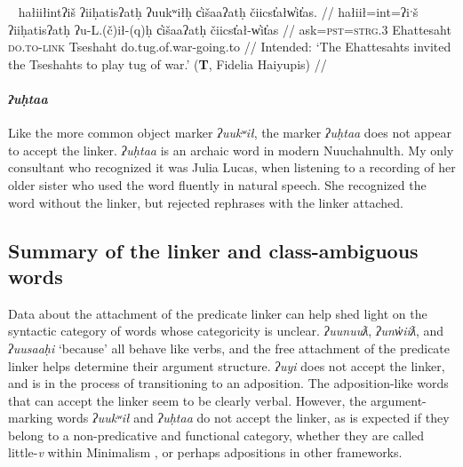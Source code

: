 \ex~ \label{ex:tugofwar2}
\begingl
\glpreamble *hałiiłintʔiš ʔiiḥatisʔatḥ ʔuukʷiłḥ c̓išaaʔatḥ čiicst̓ałw̓it̓as. //
\gla hałiił=int=ʔiˑš ʔiiḥatisʔatḥ ʔu-L.(č)ił-(q)ḥ c̓išaaʔatḥ čiicst̓ał-w̓it̓as //
\glb ask=\textsc{pst}=\textsc{strg.3} Ehattesaht \textsc{do.to}-\textsc{link} Tseshaht do.tug.of.war-going.to //
\glft Intended: `The Ehattesahts invited the Tseshahts to play tug of war.' (\textbf{T}, Fidelia Haiyupis) //
\endgl
\xe

\paragraph{\textit{ʔuḥtaa}} \label{ch:link:uhta} Like the more common object marker \textit{ʔuukʷił}, the marker \textit{ʔuḥtaa} does not appear to accept the linker. \textit{ʔuḥtaa} is an archaic word in modern Nuuchahnulth. My only consultant who recognized it was Julia Lucas, when listening to a recording of her older sister who used the word fluently in natural speech. She recognized the word without the linker, but rejected rephrases with the linker attached.

\begin{comment}
\vspace{5pt}

\noindent Context for (\ref{ex:uhta}, \ref{ex:uhtaqh}), discussing family relations.

\ex \label{ex:uhta}
\begingl
\glpreamble ʔuḥtaa Jane ʔuʔukʷił Alexandra y̓ukʷiiqsu. //
\gla ʔuḥtaa Jane ʔuʔukʷił Alexandra y̓ukʷiiqsu //
\glb only.\textsc{do.to} Jane call Alexandra younger.sibling //
\glft `Only Jane can call Alexandra younger.' (\textbf{C}, \textit{tupaat} Julia Lucas) //
\endgl
\xe

\ex~ \label{ex:uhtaqh}
\begingl
\glpreamble *ʔuḥtaaqḥ Jane ʔuʔukʷił Alexandra y̓ukʷiiqsu. //
\gla ʔuḥtaa-(q)ḥ Jane ʔuʔukʷił Alexandra y̓ukʷiiqsu //
\glb only.\textsc{do.to}-\textsc{link} Jane call Alexandra younger.sibling //
\glft Intended: `Only Jane can call Alexandra younger.' (\textbf{C}, \textit{tupaat} Julia Lucas) //
\endgl
\xe
\end{comment}

\subsection{Summary of the linker and class-ambiguous words}

Data about the attachment of the predicate linker can help shed light on the syntactic category of words whose categoricity is unclear. \textit{ʔuunuuƛ}, \textit{ʔunw̓iiƛ}, and \textit{ʔuusaaḥi} `because' all behave like verbs, and the free attachment of the predicate linker helps determine their argument structure. \textit{ʔuyi} does not accept the linker, and is in the process of transitioning to an adposition. The adposition-like words that can accept the linker seem to be clearly verbal. However, the argument-marking words \textit{ʔuukʷił} and \textit{ʔuḥtaa} do not accept the linker, as is expected if they belong to a non-predicative and functional category, whether they are called little-\textit{v} within Minimalism \citep{woo2007b}, or perhaps adpositions in other frameworks.


